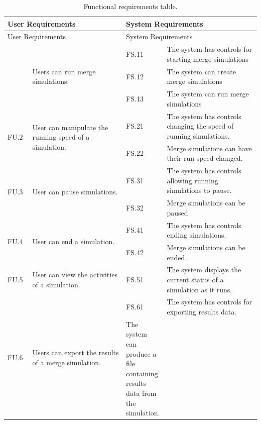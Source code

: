 \begin{longtable}{|p{0.1\linewidth}|p{0.4\linewidth}|p{0.1\linewidth}|p{0.4\linewidth}|}
\caption{Functional requirements table.}\label{tab:functionalRequirements}\\
\hline
\multicolumn{2}{|l|}{User Requirements} & \multicolumn{2}{l|}{System Requirements} \\
\hline
\endfirsthead

\hline
\multicolumn{2}{|l|}{User Requirements} & \multicolumn{2}{l|}{System Requirements} \\
\hline
\endhead

\hline
\endfoot

\hline
\endlastfoot

\multirow{3}{*}{FU.1} & \multirow{3}{*}{\parbox{\linewidth}{Users can run merge simulations.}} 
 & FS.11 & The system has controls for starting merge simulations \\
 &  & FS.12 & The system can create merge simulations \\
 &  & FS.13 & The system can run merge simulations \\
\hline
\multirow{2}{*}{FU.2} & \multirow{2}{*}{\parbox{\linewidth}{User can manipulate the running speed of a simulation.}}
 & FS.21 & The system has controls changing the speed of running simulations. \\
 &  & FS.22 & Merge simulations can have their run speed changed. \\ 
\hline
\multirow{2}{*}{FU.3} & \multirow{2}{*}{\parbox{\linewidth}{User can pause simulations.}}
 & FS.31 & The system has controls allowing running simulations to pause. \\
 &  & FS.32 & Merge simulations can be paused \\ 
\hline
\multirow{2}{*}{FU.4} & \multirow{2}{*}{\parbox{\linewidth}{User can end a simulation.}}
 & FS.41 & The system has controls ending simulations. \\
 &  & FS.42 & Merge simulations can be ended. \\ 
\hline
FU.5 & User can view the activities of a simulation. & FS.51 & The system displays the current status of a simulation as it runs. \\
\hline
\multirow{9}{*}{FU.6} & \multirow{9}{*}{\parbox{\linewidth}{Users can export the results of a merge simulation.}}
 & FS.61 & The system has controls for exporting results data. \\
 & FS.62 & The system can produce a file containing results data from the simulation. \\

\end{longtable}
